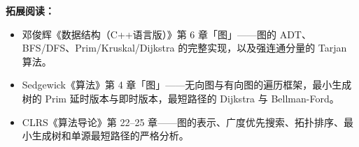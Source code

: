 \noindent\textbf{拓展阅读：}
\begin{itemize}
    \item 邓俊辉《数据结构（C++语言版）》第 6 章「图」——图的 ADT、BFS/DFS、Prim/Kruskal/Dijkstra 的完整实现，以及强连通分量的 Tarjan 算法。
    \item Sedgewick《算法》第 4 章「图」——无向图与有向图的遍历框架，最小生成树的 Prim 延时版本与即时版本，最短路径的 Dijkstra 与 Bellman-Ford。
    \item CLRS《算法导论》第 22--25 章——图的表示、广度优先搜索、拓扑排序、最小生成树和单源最短路径的严格分析。
\end{itemize}

\newpage

